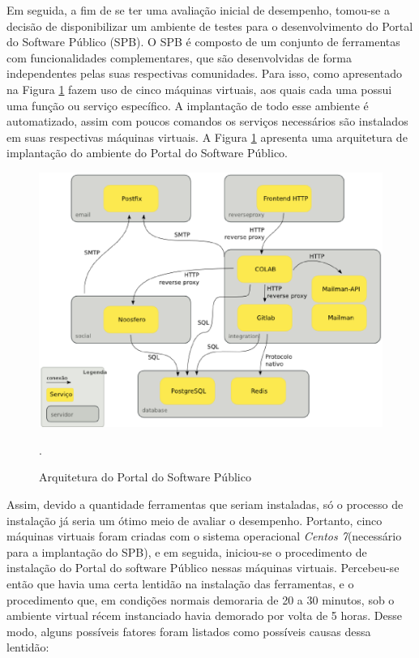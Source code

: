 \begin{apendicesenv}
Em seguida, a fim de se ter uma avaliação inicial de desempenho, tomou-se a decisão de disponibilizar um ambiente de testes para o desenvolvimento do Portal do Software Público (SPB). O SPB é composto de um conjunto de ferramentas com funcionalidades complementares, que são desenvolvidas de forma independentes pelas suas respectivas comunidades\cite{softwarepublico}. Para isso, como apresentado na Figura \ref{SPB} fazem uso de cinco máquinas virtuais, aos quais cada uma possui uma função ou serviço específico. A implantação de todo esse ambiente é automatizado, assim com poucos comandos os serviços necessários são instalados em suas respectivas máquinas virtuais. A Figura \ref{SPB} apresenta uma arquitetura de implantação do ambiente do Portal do Software Público. 
\begin{figure}[!htb]
\centering
\includegraphics [keepaspectratio=true,scale=0.60]{figuras/arquiteturaSPB.eps}
\caption{Arquitetura do Portal do Software Público}
\cite{softwarepublico}.
\label{SPB}
\end{figure}

Assim, devido a quantidade ferramentas que seriam instaladas, só o processo de instalação já seria um ótimo meio de avaliar o desempenho. Portanto, cinco máquinas virtuais foram criadas com o sistema operacional \textit{Centos 7}(necessário para a implantação do SPB), e em seguida, iniciou-se o procedimento de instalação do Portal do software Público nessas máquinas virtuais. Percebeu-se então que havia uma certa lentidão na instalação das ferramentas, e o procedimento que, em condições normais demoraria de 20 a 30 minutos, sob o ambiente virtual récem instanciado havia demorado por volta de 5 horas. Desse modo, alguns possíveis fatores foram listados como possíveis causas dessa lentidão:


\end{apendicesenv}
